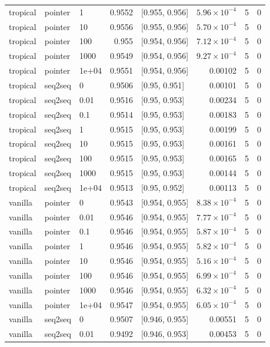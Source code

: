\documentclass[10pt]{article}
\begin{document}
{\begin{longtable}{lllrlrrr}
tropical & pointer & 1 & 0.9552 & [0.955, 0.956] & $5.96\times10^{-4}$ & 5 & 0\\
tropical & pointer & 10 & 0.9556 & [0.955, 0.956] & $5.70\times10^{-4}$ & 5 & 0\\
tropical & pointer & 100 & 0.955 & [0.954, 0.956] & $7.12\times10^{-4}$ & 5 & 0\\
tropical & pointer & 1000 & 0.9549 & [0.954, 0.956] & $9.27\times10^{-4}$ & 5 & 0\\
tropical & pointer & 1e+04 & 0.9551 & [0.954, 0.956] & 0.00102 & 5 & 0\\
tropical & seq2seq & 0 & 0.9506 & [0.95, 0.951] & 0.00101 & 5 & 0\\
tropical & seq2seq & 0.01 & 0.9516 & [0.95, 0.953] & 0.00234 & 5 & 0\\
tropical & seq2seq & 0.1 & 0.9514 & [0.95, 0.953] & 0.00183 & 5 & 0\\
tropical & seq2seq & 1 & 0.9515 & [0.95, 0.953] & 0.00199 & 5 & 0\\
tropical & seq2seq & 10 & 0.9515 & [0.95, 0.953] & 0.00161 & 5 & 0\\
tropical & seq2seq & 100 & 0.9515 & [0.95, 0.953] & 0.00165 & 5 & 0\\
tropical & seq2seq & 1000 & 0.9515 & [0.95, 0.953] & 0.00144 & 5 & 0\\
tropical & seq2seq & 1e+04 & 0.9513 & [0.95, 0.952] & 0.00113 & 5 & 0\\
vanilla & pointer & 0 & 0.9543 & [0.954, 0.955] & $8.38\times10^{-4}$ & 5 & 0\\
vanilla & pointer & 0.01 & 0.9546 & [0.954, 0.955] & $7.77\times10^{-4}$ & 5 & 0\\
vanilla & pointer & 0.1 & 0.9546 & [0.954, 0.955] & $5.87\times10^{-4}$ & 5 & 0\\
vanilla & pointer & 1 & 0.9546 & [0.954, 0.955] & $5.82\times10^{-4}$ & 5 & 0\\
vanilla & pointer & 10 & 0.9546 & [0.954, 0.955] & $5.16\times10^{-4}$ & 5 & 0\\
vanilla & pointer & 100 & 0.9546 & [0.954, 0.955] & $6.99\times10^{-4}$ & 5 & 0\\
vanilla & pointer & 1000 & 0.9546 & [0.954, 0.955] & $6.32\times10^{-4}$ & 5 & 0\\
vanilla & pointer & 1e+04 & 0.9547 & [0.954, 0.955] & $6.05\times10^{-4}$ & 5 & 0\\
vanilla & seq2seq & 0 & 0.9507 & [0.946, 0.955] & 0.00551 & 5 & 0\\
vanilla & seq2seq & 0.01 & 0.9492 & [0.946, 0.953] & 0.00453 & 5 & 0\\

\end{longtable}}
\end{document}
